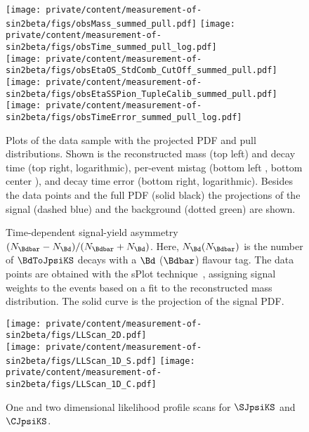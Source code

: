 %
\begin{figure}
\centering
  \texttt{[image: private/content/measurement-of-sin2beta/figs/obsMass\_summed\_pull.pdf]} 
  \texttt{[image: private/content/measurement-of-sin2beta/figs/obsTime\_summed\_pull\_log.pdf]} \\
  \texttt{[image: private/content/measurement-of-sin2beta/figs/obsEtaOS\_StdComb\_CutOff\_summed\_pull.pdf]}
  \texttt{[image: private/content/measurement-of-sin2beta/figs/obsEtaSSPion\_TupleCalib\_summed\_pull.pdf]}
  \texttt{[image: private/content/measurement-of-sin2beta/figs/obsTimeError\_summed\_pull\_log.pdf]}
  \caption{Plots of the \BdToJpsiKS data sample with the projected \ac{PDF} and
  pull distributions. Shown is the reconstructed mass \obsMass (top left) and
  decay time \obsTime (top right, logarithmic), per-event mistag (bottom left
  \obsEtaOS, bottom center \obsEtaSS), and decay time error \obsTimeError (bottom
  right, logarithmic). Besides the data points and the full
  \ac{PDF} (solid black) the projections of the signal (dashed blue) and the
  background (dotted green) are shown.}
  \label{fig:measurement_of_sin2beta:cpv_measurement:results:plots:dimensions}
\end{figure}
%
\begin{figure}
\centering
  \begin{tikzpicture}[scale=0.7]
  
  \end{tikzpicture}
  \caption{
    Time-dependent signal-yield asymmetry $(N_{\Bdbar} - N_{\Bd})/(N_{\Bdbar} +
    N_{\Bd})$. Here, $N_{\Bd} (N_{\Bdbar})$ is the number of $\BdToJpsiKS$ decays with
    a $\Bd$ ($\Bdbar$) flavour tag. The data points are obtained with the sPlot
    technique~\cite{Pivk:2004ty}, assigning signal weights to the events based on a
    fit to the reconstructed mass distribution. The solid curve is the projection of
    the signal PDF.}
  \label{fig:measurement_of_sin2beta:cpv_measurement:results:plots:asymmetry}
\end{figure}
%
\begin{figure}
  \centering
  \texttt{[image: private/content/measurement-of-sin2beta/figs/LLScan\_2D.pdf]} \\
  \texttt{[image: private/content/measurement-of-sin2beta/figs/LLScan\_1D\_S.pdf]}
  \texttt{[image: private/content/measurement-of-sin2beta/figs/LLScan\_1D\_C.pdf]}
  \caption{One and two dimensional likelihood profile scans for $\SJpsiKS$ and $\CJpsiKS$.}
  \label{fig:measurement_of_sin2beta:cpv_measurement:results:plots:ll_scan}
\end{figure}
